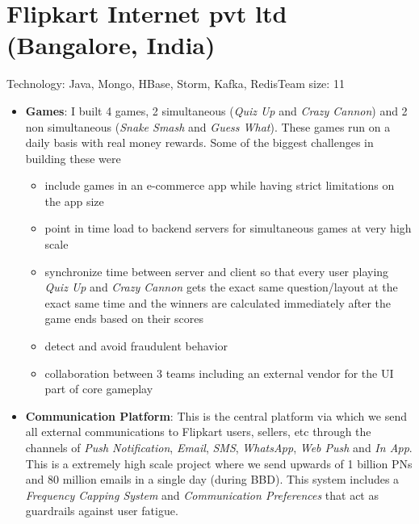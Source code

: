 \documentclass[11pt,a4paper,sans]{moderncv} %
\begin{document}
\section{Flipkart Internet pvt ltd (Bangalore, India)}
         {Technology: Java, Mongo, HBase, Storm, Kafka, Redis}{Team size: 11}
         {\begin{itemize}
            \item \textbf{Games}: I built 4 games, 2 simultaneous (\textit{Quiz Up} and \textit{Crazy Cannon}) and 2 non simultaneous (\textit{Snake Smash} and \textit{Guess What}). These games run on a daily basis with real money rewards. Some of the biggest challenges in building these were
              \begin{itemize}
                \item include games in an e-commerce app while having strict limitations on the app size
                \item point in time load to backend servers for simultaneous games at very high scale
                \item synchronize time between server and client so that every user playing \textit{Quiz Up} and \textit{Crazy Cannon} gets the exact same question/layout at the exact same time and the winners are calculated immediately after the game ends based on their scores
                \item detect and avoid fraudulent behavior
                \item collaboration between 3 teams including an external vendor for the UI part of core gameplay
              \end{itemize}
            \item \textbf{Communication Platform}: This is the central platform via which we send all external communications to Flipkart users, sellers, etc through the channels of \textit{Push Notification}, \textit{Email},  \textit{SMS}, \textit{WhatsApp}, \textit{Web Push} and \textit{In App}. This is a extremely high scale project where we send upwards of 1 billion PNs and 80 million emails in a single day (during BBD). This system includes a \textit{Frequency Capping System} and \textit{Communication Preferences} that act as guardrails against user fatigue.

\end{itemize}}
\end{document}
